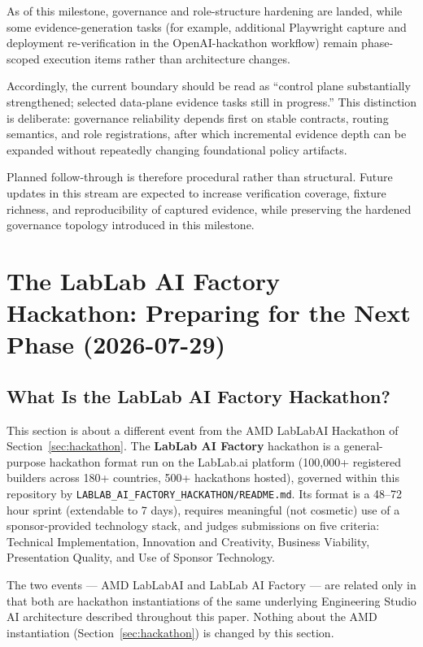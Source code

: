 \documentclass[12pt]{article}
\newcommand{\code}[1]{\texttt{#1}}
\newcommand{\LabLabFactoryReadme}{\code{LABLAB\_AI\_\allowbreak FACTORY\_\allowbreak HACKATHON/\allowbreak README.md}}
\begin{document}
As of this milestone, governance and role-structure hardening are landed,
while some evidence-generation tasks (for example, additional Playwright
capture and deployment re-verification in the OpenAI-hackathon workflow)
remain phase-scoped execution items rather than architecture changes.

Accordingly, the current boundary should be read as ``control plane
substantially strengthened; selected data-plane evidence tasks still in
progress.'' This distinction is deliberate: governance reliability
depends first on stable contracts, routing semantics, and role
registrations, after which incremental evidence depth can be expanded
without repeatedly changing foundational policy artifacts.

Planned follow-through is therefore procedural rather than structural.
Future updates in this stream are expected to increase verification
coverage, fixture richness, and reproducibility of captured evidence,
while preserving the hardened governance topology introduced in this
milestone.

\newpage
\section{The LabLab AI Factory Hackathon: Preparing for the Next Phase (2026-07-29)}
\label{sec:lablab-factory}

\subsection{What Is the LabLab AI Factory Hackathon?}

This section is about a different event from the AMD LabLabAI
Hackathon of Section~\ref{sec:hackathon}.  The \textbf{LabLab AI
Factory} hackathon is a general-purpose hackathon format run on the
LabLab.ai platform (100,000+ registered builders across 180+
countries, 500+ hackathons hosted), governed within this repository
by \LabLabFactoryReadme{}.  Its format is a 48--72 hour sprint
(extendable to 7 days), requires meaningful (not cosmetic) use of a
sponsor-provided technology stack, and judges submissions on five
criteria: Technical Implementation, Innovation and Creativity,
Business Viability, Presentation Quality, and Use of Sponsor
Technology.

The two events --- AMD LabLabAI and LabLab AI Factory --- are related
only in that both are hackathon instantiations of the same underlying
Engineering Studio AI architecture described throughout this paper.
Nothing about the AMD instantiation (Section~\ref{sec:hackathon}) is
changed by this section.
\end{document}
